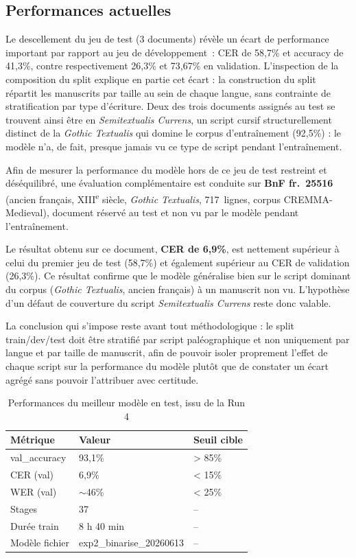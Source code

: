 ﻿\documentclass[twoside,twocolumn,10pt]{article}
\begin{document}
\subsection{Performances actuelles}

Le descellement du jeu de test (3 documents) révèle un écart de
performance important par rapport au jeu de développement~: CER de
58,7\% et accuracy de 41,3\%, contre respectivement 26,3\% et 73,67\% en
validation. L'inspection de la composition du split explique en partie
cet écart : la construction du split répartit les manuscrits par taille au sein de chaque langue, sans contrainte de stratification par type d'écriture. Deux des trois documents assignés au test se trouvent ainsi être en \textit{Semitextualis Currens}, un script cursif structurellement distinct de la \textit{Gothic Textualis} qui domine le corpus d'entraînement (92,5\%) : le modèle n'a, de fait, presque jamais vu ce type de script pendant l'entra\^inement.

Afin de mesurer la performance du modèle hors de ce jeu de test
restreint et déséquilibré, une évaluation compl\'ementaire est conduite
sur \textbf{BnF fr.~25516} (ancien français, XIII\textsuperscript{e}
siècle, \textit{Gothic Textualis}, 717~lignes, corpus CREMMA-Medieval),
document réservé au test et non vu par le modèle pendant
l'entra\^inement.

Le résultat obtenu sur ce document, \textbf{CER de 6,9\%}, est nettement supérieur \`a celui du premier jeu de test (58,7\%) et également supérieur au CER de validation (26,3\%). Ce résultat confirme que le modèle généralise bien sur le script dominant du corpus (\textit{Gothic Textualis}, ancien fran\c{c}ais) \`a un manuscrit non vu. L'hypoth\`ese d'un défaut de couverture du script \textit{Semitextualis Currens} reste donc valable.

La conclusion qui s’impose reste avant tout méthodologique : le split train/dev/test doit être stratifié par script paléographique et non uniquement par langue et par taille de manuscrit, afin de pouvoir isoler proprement l’effet de chaque script sur la performance du modèle plutôt que de constater un écart agrégé sans pouvoir l’attribuer avec certitude.

\begin{table}[!htbp]
\fontsize{10}{11}\selectfont
\centering
\caption{Performances du meilleur modèle en test, issu de la Run 4}
\begin{tabular}{L{2.5cm}C{3cm}C{1.5cm}}
\toprule
Métrique & Valeur & Seuil cible \\
\midrule
val\_accuracy & 93,1\% & > 85\% \\
CER (val) & 6,9\% & < 15\% \\
WER (val) & $\sim$46\% & < 25\% \\
Stages & 37 & -- \\
Durée train & 8 h 40 min & -- \\
Modèle fichier & exp2\_binarise\_20260613 & -- \\
\bottomrule
\end{tabular}
\end{table}
\end{document}
